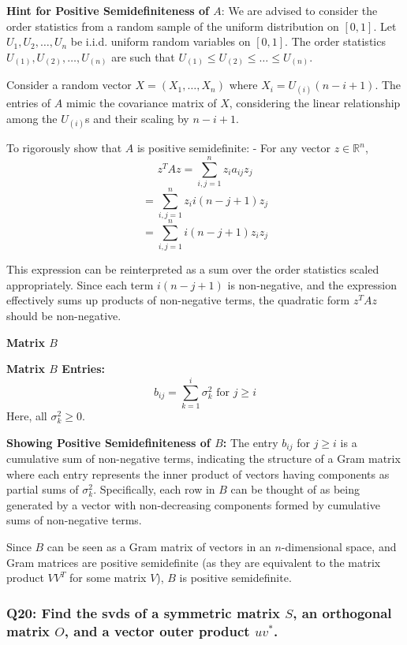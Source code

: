\documentclass[8pt]{article}
\begin{document}
{{\textbf{Hint for Positive Semidefiniteness of \(A\)}:
We are advised to consider the order statistics from a random sample of the uniform distribution on \([0, 1]\). Let \(U_1, U_2, \ldots, U_n\) be i.i.d. uniform random variables on \([0, 1]\). The order statistics \(U_{(1)}, U_{(2)}, \ldots, U_{(n)}\) are such that \(U_{(1)} \leq U_{(2)} \leq \ldots \leq U_{(n)}\).

Consider a random vector \(X = (X_1, \ldots, X_n)\) where \(X_i = U_{(i)}(n - i + 1)\). The entries of \(A\) mimic the covariance matrix of \(X\), considering the linear relationship among the \(U_{(i)}\)s and their scaling by \(n - i + 1\).

To rigorously show that \(A\) is positive semidefinite:
- For any vector \(z \in \mathbb{R}^n\),
\[ z^T A z = \sum_{i,j=1}^n z_i a_{ij} z_j \]
\[ = \sum_{i,j=1}^n z_i i(n - j + 1) z_j \]
\[ = \sum_{i,j=1}^n i(n - j + 1) z_i z_j \]

This expression can be reinterpreted as a sum over the order statistics scaled appropriately. Since each term \(i(n - j + 1)\) is non-negative, and the expression effectively sums up products of non-negative terms, the quadratic form \(z^T A z\) should be non-negative.

\textbf{Matrix \(B\)}

\textbf{ Matrix \(B\) Entries:}
\[ b_{ij} = \sum_{k=1}^i \sigma_k^2 \text{ for } j \geq i \]
Here, all \(\sigma_k^2 \geq 0\).

\textbf{Showing Positive Semidefiniteness of \(B\):}
The entry \(b_{ij}\) for \(j \geq i\) is a cumulative sum of non-negative terms, indicating the structure of a Gram matrix where each entry represents the inner product of vectors having components as partial sums of \(\sigma_k^2\). Specifically, each row in \(B\) can be thought of as being generated by a vector with non-decreasing components formed by cumulative sums of non-negative terms.

Since \(B\) can be seen as a Gram matrix of vectors in an \(n\)-dimensional space, and Gram matrices are positive semidefinite (as they are equivalent to the matrix product \(VV^T\) for some matrix \(V\)), \(B\) is positive semidefinite.

\subsubsection*{Q20: Find the svds of a symmetric matrix \( S \), an orthogonal matrix \( O \), and a vector outer product \( uv^* \).}

}}
\end{document}
